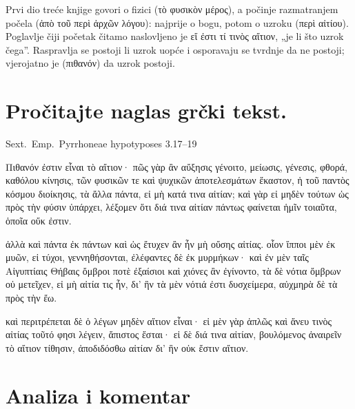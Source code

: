 Prvi dio treće knjige govori o fizici \textgreek[variant=ancient]{(τὸ φυσικὸν μέρος)}, a počinje razmatranjem počela \textgreek[variant=ancient]{(ἀπὸ τοῦ περὶ ἀρχῶν λόγου)}: najprije o bogu, potom o uzroku \textgreek[variant=ancient]{(περὶ αἰτίου).} Poglavlje čiji početak čitamo naslovljeno je \textgreek[variant=ancient]{εἴ ἐστι τί τινὸς αἴτιον,} „je li što uzrok čega''. Raspravlja se postoji li uzrok uopće i osporavaju se tvrdnje da ne postoji; vjerojatno je \textgreek[variant=ancient]{(πιθανόν)} da uzrok postoji.



\section*{Pročitajte naglas grčki tekst.}

Sext.\ Emp.\ Pyrrhoneae hypotyposes 3.17–19


\medskip


{\large

\begin{greek}

\noindent  Πιθανόν ἐστιν εἶναι τὸ αἴτιον· πῶς γὰρ ἂν αὔξησις γένοιτο, μείωσις, γένεσις, φθορά, καθόλου κίνησις, τῶν φυσικῶν τε καὶ ψυχικῶν ἀποτελεσμάτων ἕκαστον, ἡ τοῦ παντὸς κόσμου διοίκησις, τὰ ἄλλα πάντα, εἰ μὴ κατά τινα αἰτίαν; καὶ γὰρ εἰ μηδὲν τούτων ὡς πρὸς τὴν φύσιν ὑπάρχει, λέξομεν ὅτι διά τινα αἰτίαν πάντως φαίνεται ἡμῖν τοιαῦτα, ὁποῖα οὔκ ἐστιν.

\noindent  ἀλλὰ καὶ πάντα ἐκ πάντων καὶ ὡς ἔτυχεν ἂν ἦν μὴ οὔσης αἰτίας. οἷον ἵπποι μὲν ἐκ μυῶν, εἰ τύχοι, γεννηθήσονται, ἐλέφαντες δὲ ἐκ μυρμήκων· καὶ ἐν μὲν ταῖς Αἰγυπτίαις Θήβαις ὄμβροι ποτὲ ἐξαίσιοι καὶ χιόνες ἂν ἐγίνοντο, τὰ δὲ νότια ὄμβρων οὐ μετεῖχεν, εἰ μὴ αἰτία τις ἦν, δι’ ἣν τὰ μὲν νότιά ἐστι δυσχείμερα, αὐχμηρὰ δὲ τὰ πρὸς τὴν ἔω.

\noindent  καὶ περιτρέπεται δὲ ὁ λέγων μηδὲν αἴτιον εἶναι· εἰ μὲν γὰρ ἁπλῶς καὶ ἄνευ τινὸς αἰτίας τοῦτό φησι λέγειν, ἄπιστος ἔσται· εἰ δὲ διά τινα αἰτίαν, βουλόμενος ἀναιρεῖν τὸ αἴτιον τίθησιν, ἀποδιδόσθω αἰτίαν δι’ ἣν οὐκ ἔστιν αἴτιον.

\end{greek}

}


\section*{Analiza i komentar}

